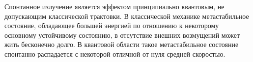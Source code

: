Спонтанное излучение является эффектом принципиально квантовым, не допускающим 
классической трактовки. В классической механике метастабильное состояние, 
обладающее большей энергией по отношению к некоторому основному устойчивому 
состоянию, в отсутствие внешних возмущений может жить бесконечно долго. В 
квантовой области такое метастабильное состояние спонтанно распадается с 
некоторой отличной от нуля средней скоростью.